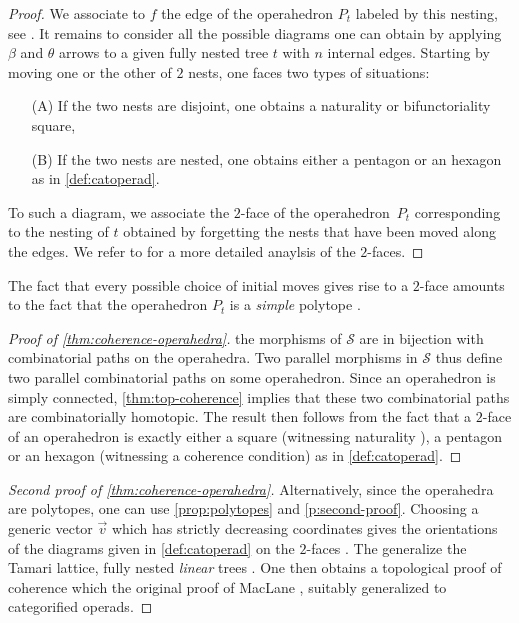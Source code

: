 {\begin{proof}
We associate to $f$ the edge of the operahedron $P_t$ labeled by this nesting, see \cite[Def.~2.8 \& Prop.~3.11]{laplante-anfossiDiagonalOperahedra2022a}.
It remains to consider all the possible diagrams one can obtain by applying $\beta$ and $\theta$ arrows to a given fully nested tree $t$ with $n$ internal edges. 
Starting by moving one or the other of $2$ nests, one faces two types of situations:
\begin{itemize}
    \item[(A)] If the two nests are disjoint, one obtains a naturality or bifunctoriality square,
    \item[(B)] If the two nests are nested, one obtains either a pentagon or an hexagon as in \cref{def:catoperad}.
\end{itemize}
To such a diagram, we associate the $2$-face of the operahedron~$P_t$ corresponding to the nesting of $t$ obtained by forgetting the nests that have been moved along the edges.
We refer to \cite[Sec.~2]{CLA24} for a more detailed anaylsis of the $2$-faces.  
\end{proof}
\begin{rem}
    The fact that every possible choice of initial moves gives rise to a $2$-face amounts to the fact that the operahedron $P_t$ is a \emph{simple} polytope \cite[Sec.~9]{DP-HP}.
\end{rem}}

\begin{proof}[Proof of {\cref{thm:coherence-operahedra}}]
     the morphisms of $\mathcal{S}$ are in bijection with combinatorial paths on the operahedra.
Two parallel morphisms in $\mathcal{S}$ thus define two parallel combinatorial paths on some operahedron. 
Since an operahedron is simply connected, \cref{thm:top-coherence} implies that these two combinatorial paths are combinatorially homotopic. 
The result then follows from  the fact that a $2$-face of an operahedron is exactly either a square (witnessing naturality ), a pentagon or an hexagon (witnessing a coherence condition) as in \cref{def:catoperad}.
\end{proof}

\begin{proof}[Second proof of {\cref{thm:coherence-operahedra}}]
    Alternatively, since the operahedra are polytopes, one can use \cref{prop:polytopes} and \cref{p:second-proof}. 
    Choosing a generic vector $\vec v$ which has strictly decreasing coordinates gives the orientations of the diagrams given in \cref{def:catoperad} on the $2$-faces \cite[Prop.~3.11]{laplante-anfossiDiagonalOperahedra2022a}.
    The  generalize the Tamari lattice,  fully nested \emph{linear} trees \cite{DefanSack24}.
    One then obtains a topological proof of coherence which  the original proof of MacLane \cite[Thm.~3.1]{MacLane63}, suitably generalized to categorified operads. 
\end{proof}
   
